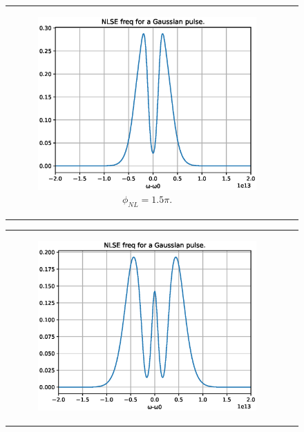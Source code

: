 \begin{figure}[label={fig:spmssfm}, caption={Shape of the spectra for Gaussian pulses by maximum phase shift ($\phi_{NL}$).}]
\begin{tabular}[c]{cc}
        \hfill
        \begin{subfigure}[b]{.53\textwidth}
		    \centering	
            \includegraphics[width=1\linewidth]{figures/chap3/ssfm_spm/1_5pi.eps}
            \caption{$\phi_{NL}= 1.5\pi$.}
            \label{fig:spm15pi}
        \end{subfigure}
        \end{tabular}
        \begin{tabular}[c]{cc}
        \centering	
        \begin{subfigure}[b]{.53\textwidth}
		    \centering	
            \includegraphics[width=1\linewidth]{figures/chap3/ssfm_spm/2_5pi.eps}

\end{subfigure}
\end{tabular}
\end{figure}
